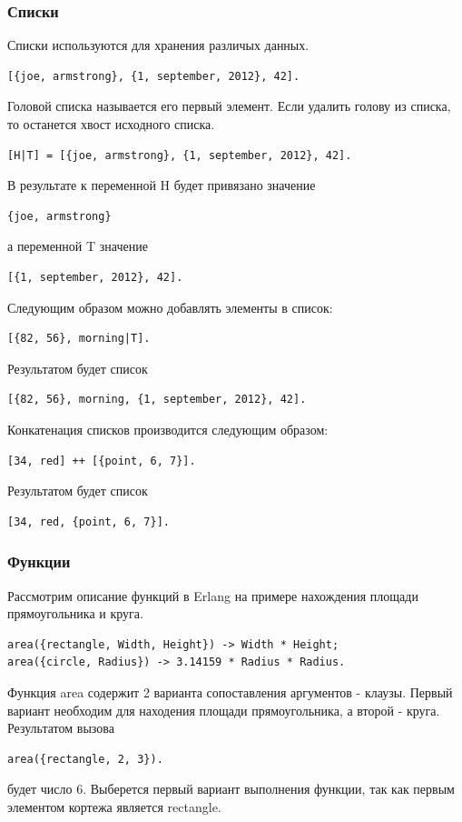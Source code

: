 		\subsubsection{Списки} 
			Списки используются для хранения различых данных.
			\begin{lstlisting}
[{joe, armstrong}, {1, september, 2012}, 42].
			\end{lstlisting}
			Головой списка называется его первый элемент. Если удалить голову из списка,
			то останется хвост исходного списка. 
			\begin{lstlisting}
[H|T] = [{joe, armstrong}, {1, september, 2012}, 42].
			\end{lstlisting}
			В результате к переменной H будет привязано значение
			\begin{lstlisting} 
{joe, armstrong}
			\end{lstlisting}
			а переменной T значение 
			\begin{lstlisting}
[{1, september, 2012}, 42].
			\end{lstlisting}
			
			Следующим образом можно добавлять элементы в список:
			\begin{lstlisting}
[{82, 56}, morning|T].
			\end{lstlisting}
			Результатом будет список
			\begin{lstlisting} 
[{82, 56}, morning, {1, september, 2012}, 42].
			\end{lstlisting}
		
			Конкатенация списков производится следующим образом:
			\begin{lstlisting}
[34, red] ++ [{point, 6, 7}].
			\end{lstlisting}
			Результатом будет список 
			\begin{lstlisting}
[34, red, {point, 6, 7}].
			\end{lstlisting}
	

		\subsubsection{Функции}
			Рассмотрим описание функций в Erlang на примере нахождения площади прямоугольника и круга.
			\begin{lstlisting}
area({rectangle, Width, Height}) -> Width * Height;
area({circle, Radius}) -> 3.14159 * Radius * Radius.
			\end{lstlisting}
			Функция area содержит 2 варианта сопоставления аргументов - клаузы. 
			Первый вариант необходим для находения площади прямоугольника, а
			второй - круга. 
			Результатом вызова 
			\begin{lstlisting}
area({rectangle, 2, 3}).
			\end{lstlisting}
			будет число 6. Выберется первый вариант выполнения функции, так как первым элементом 
			кортежа является rectangle.
			
